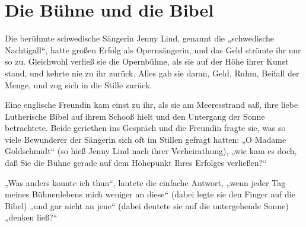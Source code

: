 \chapter{Die Bühne und die Bibel}

Die berühmte schwedische Sängerin Jenny Lind, genannt die „schwedische Nachtigall“, hatte großen Erfolg als Opernsängerin, und das Geld strömte ihr nur so zu. Gleichwohl verließ sie die Opernbühne, als sie auf der Höhe ihrer Kunst stand, und kehrte nie zu ihr zurück. Alles gab sie daran, Geld, Ruhm, Beifall der Menge, und zog sich in die Stille zurück.

Eine englische Freundin kam einst zu ihr, als sie am Meeresstrand saß, ihre liebe Lutherische Bibel auf ihrem Schooß hielt und den Untergang der Sonne betrachtete. Beide geriethen ins Gespräch und die Freundin fragte sie, was so viele Bewunderer der Sängerin sich oft im Stillen gefragt hatten: „O Madame Goldschmidt“ (so hieß Jenny Lind nach ihrer Verheirathung), „wie kam es doch, daß Sie die Bühne gerade auf dem Höhepunkt Ihres Erfolges verließen?“

„Was anders konnte ich thun“, lautete die einfache Antwort, „wenn jeder Tag meines Bühnenlebens mich weniger an diese“ (dabei legte sie den Finger auf die Bibel) „und gar nicht an jene“ (dabei deutete sie auf die untergehende Sonne) „denken ließ?“
